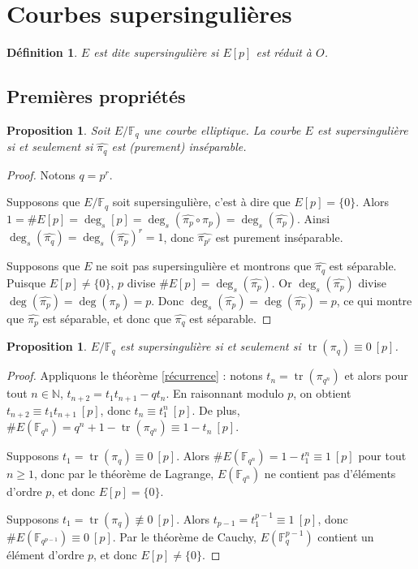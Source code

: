 \documentclass{article}
\theoremstyle{plain}%
\newtheorem{prop}[thm]{Proposition}
\newtheorem{deff}[thm]{Définition}
\theoremstyle{definition}%
\newcommand{\F}{\mathbb{F}}
\newcommand{\N}{\mathbb{N}}
\newcommand{\h}{\widehat}
\DeclareMathOperator{\tr}{tr}
\begin{document}
\section{Courbes supersingulières}

\begin{deff}
  $E$ est dite supersingulière si $E[p]$ est réduit à $O$. 
\end{deff}

\subsection{Premières propriétés}

\begin{prop}
  \label{pihatsep}
  Soit $E/\F_q$ une courbe elliptique. La courbe $E$ est supersingulière si et seulement si $\widehat{\pi_q}$ est (purement) inséparable.
\end{prop}

\begin{proof}
  Notons $q = p^r$. 

  Supposons que $E/\F_q$ soit supersingulière, c'est à dire que $E[p] = \{0\}$. Alors $1 = \#E[p] = \deg_s[p] = \deg_s(\h{\pi_{p}} \circ \pi_{p}) = \deg_s(\h{\pi_{p}})$. Ainsi $\deg_s(\h{\pi_{q}}) =  \deg_s(\h{\pi_{p}})^r= 1$, donc $\h{\pi_{p^r}}$ est purement inséparable.

  Supposons que $E$ ne soit pas supersingulière et montrons que $\h{\pi_{q}}$ est séparable. Puisque $E[p] \neq \{0\}$, $p$ divise $\#E[p] = \deg_s(\h{\pi_p})$. Or $\deg_s(\h{\pi_p})$ divise $\deg(\h{\pi_p}) = \deg({\pi_p}) = p$. Donc $\deg_s(\h{\pi_p}) = \deg(\h{\pi_p}) =p$, ce qui montre que $\h{\pi_p}$ est séparable, et donc que $\h{\pi_q}$ est séparable.
\end{proof}

\begin{prop}
  \label{pimodp}
  $E/\F_q$ est supersingulière si et seulement si $\tr(\pi_q) \equiv 0\ [p]$. 
\end{prop}

\begin{proof}
  Appliquons le théorème \ref{récurrence} : 
  notons $t_n = \tr(\pi_{q^n})$ 
  et alors pour tout $n\in\N$, 
  $t_{n+2} = t_1 t_{n+1} -qt_n$.
  En raisonnant modulo $p$, on obtient $t_{n+2} \equiv t_1 t_{n+1}\ [p]$, donc $t_n \equiv t_1^n\ [p]$. 
  De plus, $\#E(\F_{q^n}) = q^n + 1 - \tr(\pi_{q^n}) \equiv 1 - t_n\ [p]$.

Supposons $t_1 = \tr(\pi_q) \equiv 0\ [p]$. 
Alors $\#E(\F_{q^n}) = 1 - t_1^n \equiv 1\ [p]$ pour tout $n \ge 1$, donc par le théorème de Lagrange, $E(\F_{q^n})$ ne contient pas d’éléments d’ordre $p$, et donc $E[p] = \{0\}$.

Supposons $t_1 = \tr(\pi_q) \not\equiv 0\ [p]$. 
Alors $t_{p-1} = t_1^{p-1} \equiv 1\ [p]$, donc $\#E(\F_{q^{p-1}}) \equiv 0\ [p]$. Par le théorème de Cauchy, $E(\F_q^{p-1})$ contient un élément d’ordre $p$, et donc $E[p] \neq  \{0\}$.
\end{proof}
\end{document}
